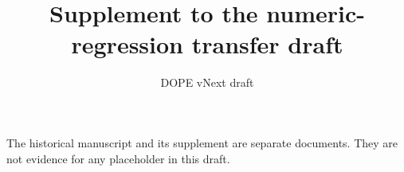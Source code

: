 \documentclass{article}
\title{Supplement to the numeric-regression transfer draft}
\author{DOPE vNext draft}
\date{}
\begin{document}
\maketitle
\noindent The historical manuscript  and its supplement are separate documents.
They are not evidence for any placeholder in this draft.



\nocite{*}


\end{document}
